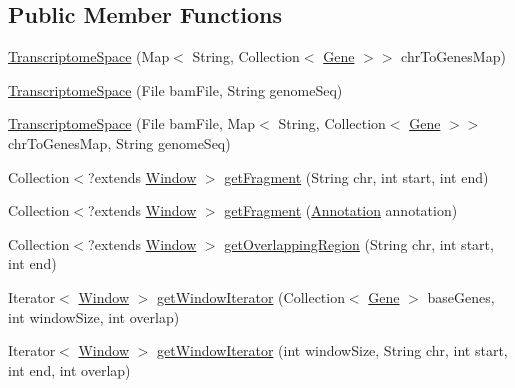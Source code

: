 \subsection*{Public Member Functions}
\begin{DoxyCompactItemize}
\item 
\hyperlink{classumms_1_1core_1_1coordinatesystem_1_1_transcriptome_space_ac9a78492ff6438460f27b95d0a18f506}{Transcriptome\+Space} (Map$<$ String, Collection$<$ \hyperlink{classumms_1_1core_1_1annotation_1_1_gene}{Gene} $>$$>$ chr\+To\+Genes\+Map)
\item 
\hyperlink{classumms_1_1core_1_1coordinatesystem_1_1_transcriptome_space_a93dbd4979e7d70040055254c551067c6}{Transcriptome\+Space} (File bam\+File, String genome\+Seq)
\item 
\hyperlink{classumms_1_1core_1_1coordinatesystem_1_1_transcriptome_space_af1b4a53b9535e9439d5d719b3a227ceb}{Transcriptome\+Space} (File bam\+File, Map$<$ String, Collection$<$ \hyperlink{classumms_1_1core_1_1annotation_1_1_gene}{Gene} $>$$>$ chr\+To\+Genes\+Map, String genome\+Seq)
\item 
Collection$<$?extends \hyperlink{interfaceumms_1_1core_1_1feature_1_1_window}{Window} $>$ \hyperlink{classumms_1_1core_1_1coordinatesystem_1_1_transcriptome_space_ac9fe2dc48421fe148ad8ccca4eabf08e}{get\+Fragment} (String chr, int start, int end)
\item 
Collection$<$?extends \hyperlink{interfaceumms_1_1core_1_1feature_1_1_window}{Window} $>$ \hyperlink{classumms_1_1core_1_1coordinatesystem_1_1_transcriptome_space_ab1942382affe07ca14c61a581447aaea}{get\+Fragment} (\hyperlink{interfaceumms_1_1core_1_1annotation_1_1_annotation}{Annotation} annotation)
\item 
Collection$<$?extends \hyperlink{interfaceumms_1_1core_1_1feature_1_1_window}{Window} $>$ \hyperlink{classumms_1_1core_1_1coordinatesystem_1_1_transcriptome_space_ae06f880bbb3b66420f0e9f70087ad8c5}{get\+Overlapping\+Region} (String chr, int start, int end)
\item 
Iterator$<$ \hyperlink{interfaceumms_1_1core_1_1feature_1_1_window}{Window} $>$ \hyperlink{classumms_1_1core_1_1coordinatesystem_1_1_transcriptome_space_a5a9e7f0787f2cc6244bd436bc5dc71fb}{get\+Window\+Iterator} (Collection$<$ \hyperlink{classumms_1_1core_1_1annotation_1_1_gene}{Gene} $>$ base\+Genes, int window\+Size, int overlap)
\item 
Iterator$<$ \hyperlink{interfaceumms_1_1core_1_1feature_1_1_window}{Window} $>$ \hyperlink{classumms_1_1core_1_1coordinatesystem_1_1_transcriptome_space_a383aa67750b15623e118c104bf98e7d4}{get\+Window\+Iterator} (int window\+Size, String chr, int start, int end, int overlap)

\end{DoxyCompactItemize}
